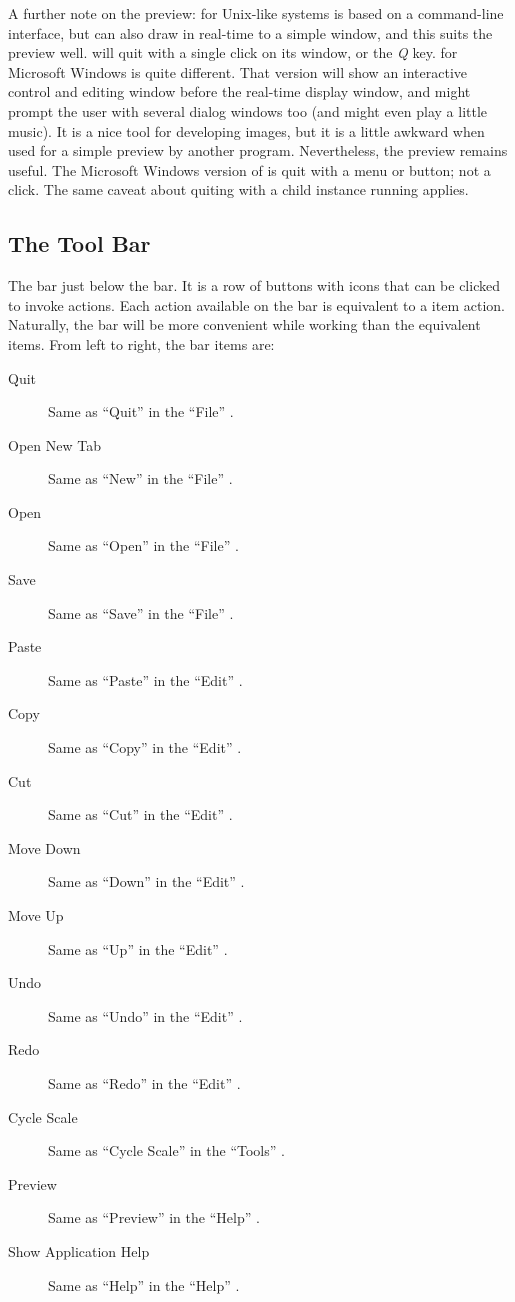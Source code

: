 			A further note on the preview: \IXpov{} for Unix-like
			systems is based on a command-line interface, but can
			also draw in real-time to a simple 
			window, and this suits the preview well. \IXpov{}
			will quit with a single click on its window, or the
			\emph{Q} key. \IXpov{} for Microsoft Windows is quite
			different. That version will show an interactive control
			and editing window before the real-time display window,
			and might prompt the user with several dialog windows
			too (and might even play a little music). It is a nice
			tool for developing \IXpov{} images, but it is a little
			awkward when used for a simple preview by another
			program. Nevertheless,
			the preview remains useful. The Microsoft Windows version
			of \IXpov{} is quit with a menu or button; not a click.
			The same caveat about quiting \IXpkg{} with
			a child \IXpov{} instance running applies.


		\subsection{The Tool Bar}%
		\label{ssec:tool_bar}
		The  bar just below the 
		bar. It is a row of buttons with icons that can be
		clicked to invoke actions. Each action available on
		the  bar is equivalent to a  item
		action. Naturally, the  bar will be more
		convenient while working than the equivalent 
		items. From left to right, the  bar
		items are:

			\begin{description}
			  \item[Quit] Same as ``Quit'' in the
			  ``File'' .
			  \item[Open New Tab] Same as ``New'' in the
			  ``File'' .
			  \item[Open] Same as ``Open'' in the
			  ``File'' .
			  \item[Save] Same as ``Save'' in the
			  ``File'' .
			  \item[Paste] Same as ``Paste'' in the
			  ``Edit'' .
			  \item[Copy] Same as ``Copy'' in the
			  ``Edit'' .
			  \item[Cut] Same as ``Cut'' in the
			  ``Edit'' .
			  \item[Move Down] Same as ``Down'' in the
			  ``Edit'' .
			  \item[Move Up] Same as ``Up'' in the
			  ``Edit'' .
			  \item[Undo] Same as ``Undo'' in the
			  ``Edit'' .
			  \item[Redo] Same as ``Redo'' in the
			  ``Edit'' .
			  \item[Cycle Scale] Same as ``Cycle Scale'' in the
			  ``Tools'' .
			  \item[Preview] Same as ``Preview'' in the
			  ``Help'' .
			  \item[Show Application Help] Same as ``Help'' in the
			  ``Help'' .
			\end{description}
			
